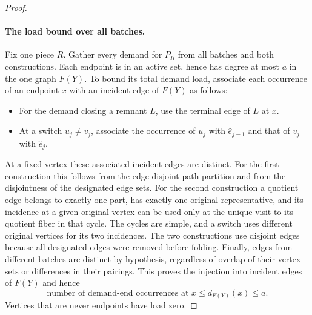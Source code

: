 \begin{proof}



\paragraph{The load bound over all batches.}
Fix one piece $R$.  Gather every demand for $P_R$ from all batches and
both constructions.  Each endpoint is in an active set, hence has
degree at most $a$ in the one graph $F(Y)$.  To bound its total demand
load, associate each occurrence of an endpoint $x$ with an incident
edge of $F(Y)$ as follows:
\begin{itemize}
 \item For the demand closing a remnant $L$, use the terminal edge of
       $L$ at $x$.
 \item At a switch $u_j\ne v_j$, associate the occurrence of $u_j$
       with $\widehat e_{j-1}$ and that of $v_j$ with $\widehat e_j$.
\end{itemize}
At a fixed vertex these associated incident edges are distinct.  For
the first construction this follows from the edge-disjoint path
partition and from the disjointness of the designated edge sets.
For the second construction a quotient edge belongs to exactly one
part, has exactly one original representative, and its incidence at a
given original vertex can be used only at the unique visit to its
quotient fiber in that cycle.  The cycles are simple, and a switch uses
different original vertices for its two incidences.  The two constructions
use disjoint edges because all designated edges were removed before
folding.  Finally, edges from different batches are distinct by
hypothesis, regardless of overlap of their vertex sets or differences
in their pairings.  This proves the injection into incident edges of
$F(Y)$ and hence
\begin{equation}\label{eq:batch-global-load}
 \text{number of demand-end occurrences at }x
 \le d_{F(Y)}(x)\le a.
\end{equation}
Vertices that are never endpoints have load zero.


\end{proof}
